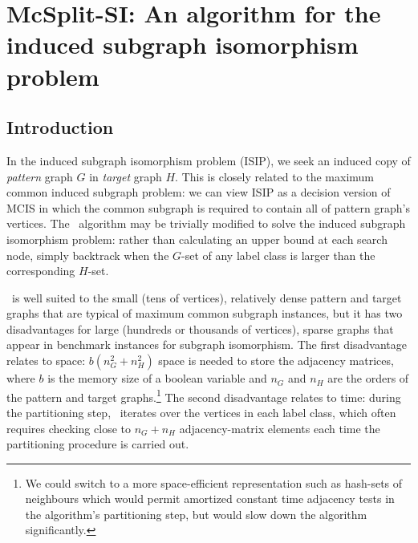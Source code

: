 
\newcommand{\varStartG}{\ensuremath{\AlgVar{start}_G}}
\newcommand{\varEndG}{\ensuremath{\AlgVar{end}_G}}
\newcommand{\varStartH}{\ensuremath{\AlgVar{start}_H}}
\newcommand{\varEndH}{\ensuremath{\AlgVar{end}_H}}
\newcommand{\varActive}{\ensuremath{\AlgVar{active}}}
\newcommand{\varSplitting}{\ensuremath{\AlgVar{splitting}}}
\newcommand{\varPrev}{\ensuremath{\AlgVar{prev}}}
\newcommand{\varNext}{\ensuremath{\AlgVar{next}}}
\newcommand{\labelClass}{\ensuremath{\AlgVar{labelClass}}}
\newcommand{\vertexPtr}{\ensuremath{\AlgVar{vertexPtr}}}
\newcommand{\calLC}{\ensuremath{\mathcal{LC}}}
\newcommand{\LC}{\ensuremath{\AlgVar{LC}}}
\newcommand{\Gptrs}{\ensuremath{P_G}}
\newcommand{\Hptrs}{\ensuremath{P_H}}
\newcommand{\Garray}{\ensuremath{A_G}}
\newcommand{\Harray}{\ensuremath{A_H}}

\chapter{McSplit-SI: An algorithm for the induced subgraph isomorphism problem}
\label{c:mcsplit-si}

\section{Introduction}

In the induced subgraph isomorphism problem (ISIP), we seek an induced copy of \emph{pattern} graph $G$ in \emph{target} graph $H$. This is closely related to the maximum common induced subgraph problem: we can view ISIP as a decision version of MCIS in which the common subgraph is required to contain all of pattern graph's vertices.
The \McSplit\ algorithm may be trivially modified to solve the induced subgraph isomorphism problem: rather than calculating an upper bound at each search node, simply backtrack when the $G$-set of any label class is larger than the corresponding $H$-set.

\McSplit\ is well suited to the small (tens of vertices), relatively dense pattern and target graphs that are typical of maximum common subgraph instances, but it has two disadvantages for large (hundreds or thousands of vertices), sparse graphs that appear in benchmark instances for subgraph isomorphism.  The first disadvantage relates to space: $b(n_G^2 + n_H^2)$ space is needed to store the adjacency matrices, where $b$ is the memory size of a boolean variable and $n_G$ and $n_H$ are the orders of the pattern and target graphs.\footnote{We could switch to a more space-efficient representation such as hash-sets of neighbours which would permit amortized constant time adjacency tests in the algorithm's partitioning step, but would slow down the algorithm significantly.}  The second disadvantage relates to time: during the partitioning step, \McSplit\ iterates over the vertices in each label class, which often requires checking close to $n_G + n_H$ adjacency-matrix elements each time the partitioning procedure is carried out.

